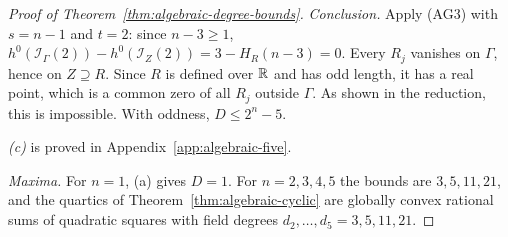 \begin{proof}[Proof of Theorem~\ref{thm:algebraic-degree-bounds}]
\emph{Conclusion.} Apply (AG3) with $s=n-1$ and $t=2$: since $n-3\ge1$,
$h^0(\mathcal I_\Gamma(2))-h^0(\mathcal I_Z(2))=3-H_R(n-3)=0$. Every $R_j$
vanishes on $\Gamma$, hence on $Z\supseteq R$. Since $R$ is defined over $\mathbb R$
and has odd length, it has a real point, which is a common zero of all $R_j$
outside $\Gamma$. As shown in the reduction, this is impossible. With oddness,
$D\le2^n-5$.

\emph{(c)} is proved in Appendix~\ref{app:algebraic-five}.

\emph{Maxima.} For $n=1$, (a) gives $D=1$. For $n=2,3,4,5$ the bounds are
$3,5,11,21$, and the quartics of Theorem~\ref{thm:algebraic-cyclic} are
globally convex rational sums of quadratic squares with field degrees
$d_2,\ldots,d_5=3,5,11,21$.
\end{proof}

